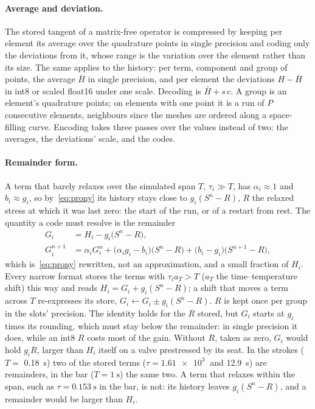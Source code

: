\documentclass[sigconf,nonacm]{acmart}
\begin{document}
\paragraph{Average and deviation.} The stored tangent of a matrix-free operator is compressed by
keeping per element its average over the quadrature points in single precision and coding only the
deviations from it, whose range is the variation over the element rather than its size. The same
applies to the history: per term, component and group of points, the average $\bar H$ in single
precision, and per element the deviations $H-\bar H$ in int8 or scaled float16 under one scale.
Decoding is $\bar H + s\,c$. A group is an element's quadrature points; on elements with one point
it is a run of $P$ consecutive elements, neighbours since the meshes are ordered along a
space-filling curve. Encoding takes three passes over the values instead of two: the averages, the
deviations' scale, and the codes.

\paragraph{Remainder form.} A term that barely relaxes over the simulated span $T$, $\tau_i\gg T$,
has $\alpha_i\approx1$ and $b_i\approx g_i$, so by~\eqref{eq:prony} its history stays close to
$g_i(S^n-R)$, $R$ the relaxed stress at which it was last zero: the start of the run, or of a
restart from rest. The quantity a code must resolve is the remainder
\begin{equation}
\begin{aligned}
  G_i &= H_i - g_i\bigl(S^n - R\bigr),\\
  G_i^{n+1} &= \alpha_iG_i^n + \bigl(\alpha_ig_i - b_i\bigr)\bigl(S^n-R\bigr) + \bigl(b_i - g_i\bigr)\bigl(S^{n+1}-R\bigr),
\end{aligned}
\end{equation}
which is~\eqref{eq:prony} rewritten, not an approximation, and a small fraction of $H_i$. Every
narrow format stores the terms with $\tau_i a_T>T$ ($a_T$ the time--temperature shift) this way
and reads $H_i = G_i + g_i(S^n-R)$; a shift that moves a term across $T$ re-expresses its store,
$G_i\leftarrow G_i\pm g_i(S^n-R)$. $R$ is kept once per group in the slots' precision. The identity
holds for the $R$ stored, but $G_i$ starts at $g_i$ times its rounding, which must stay below the
remainder: in single precision it does, while an int8 $R$ costs most of the gain. Without $R$,
taken as zero, $G_i$ would hold $g_iR$, larger than $H_i$ itself on a valve prestressed by its seat. In the strokes ($T=$
\SI{0.18}{\second}) two of the \hsStored{} stored terms ($\tau=\SI{1.61e3}{}$ and
\SI{12.9}{\second}) are remainders, in the bar ($T=\SI{1}{\second}$) the same two. A term that
relaxes within the span, such as $\tau=\SI{0.153}{\second}$ in the bar, is not: its history leaves
$g_i(S^n-R)$, and a remainder would be larger than $H_i$.
\end{document}

